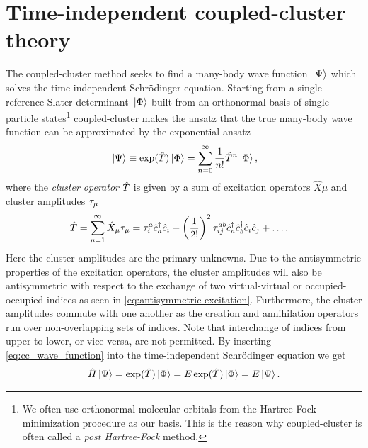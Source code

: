     \section{Time-independent coupled-cluster theory}
        The coupled-cluster method seeks to find a many-body wave function
        $\ket*{\Psi}$ which solves the time-independent Schrödinger equation.
        Starting from a single reference Slater determinant $\ket*{\Phi}$ built
        from an orthonormal basis of single-particle states\footnote{%
            We often use orthonormal molecular orbitals from the Hartree-Fock
            minimization procedure as our basis.
            This is the reason why coupled-cluster is often called a \emph{post
            Hartree-Fock} method.
        } coupled-cluster makes the ansatz that the true many-body wave function
        can be approximated by the exponential ansatz
        \begin{align}
            \ket*{\Psi} \equiv \exponential(\clust)\ket*{\slat}
            = \sum_{n = 0}^{\infty}\frac{1}{n!}\clust^n\ket*{\slat},
            \label{eq:cc_wave_function}
        \end{align}
        where the \emph{cluster operator} $\hat{T}$ is given by a sum of excitation
        operators $\hat{X}{\mu}$ and cluster amplitudes $\tau_{\mu}$
        \begin{align}
            \hat{T} &= \sum_{\mu = 1}^{\infty} \hat{X}_{\mu}\tau_{\mu}
            = \tau^a_i\hat{c}_{a}^{\dagger}\hat{c}_{i}
            + \left( \frac{1}{2!} \right)^2\tau^{ab}_{ij}\hat{c}_{a}^{\dagger}\hat{c}_{b}^{\dagger}\hat{c}_{i}\hat{c}_{j}
            + \dots.
            \label{eq:cluster-operator}
        \end{align}
        Here the cluster amplitudes are the primary unknowns.
        Due to the antisymmetric properties of the excitation operators, the
        cluster amplitudes will also be antisymmetric with respect to the
        exchange of two virtual-virtual or occupied-occupied indices as seen in
        \autoref{eq:antisymmetric-excitation}.
        Furthermore, the cluster amplitudes commute with one another as the
        creation and annihilation operators run over non-overlapping sets of
        indices.
        Note that interchange of indices from upper to lower, or vice-versa, are
        not permitted.
        By inserting \autoref{eq:cc_wave_function} into the time-independent
        Schrödinger equation we get
        \begin{align}
            \hamil\ket*{\Psi}
            = \exponential(\clust)\ket*{\slat}
            = \energy \exponential(\clust)\ket*{\slat}
            = \energy \ket*{\Psi}.
        \end{align}
